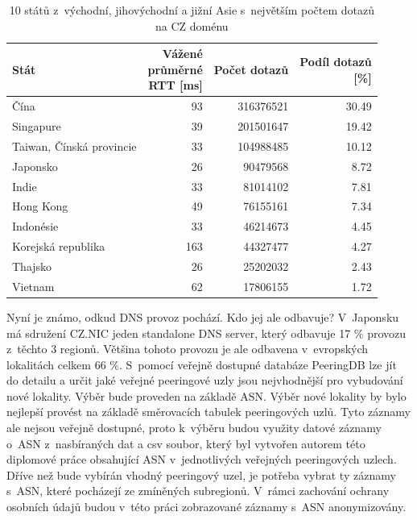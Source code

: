 \documentclass[thesis=M,czech]{src/FITthesis}[2019/12/23]
\begin{document}
\begin{table}
\centering
\begin{tabular}{lrrr}
\toprule
           Stát  &  \makecell{Vážené\\průměrné\\RTT [ms]} &  Počet dotazů &  \makecell{Podíl dotazů\\\ [\%]} \\
\midrule
                    Čína &  93 & 316376521 & 30.49 \\
               Singapure &  39 & 201501647 & 19.42 \\
Taiwan, Čínská provincie &  33 & 104988485 & 10.12 \\
                Japonsko &  26 &  90479568 &  8.72 \\
                   Indie &  33 &  81014102 &  7.81 \\
               Hong Kong &  49 &  76155161 &  7.34 \\
               Indonésie &  33 &  46214673 &  4.45 \\
      Korejská republika & 163 &  44327477 &  4.27 \\
                 Thajsko &  26 &  25202032 &  2.43 \\
                 Vietnam &  62 &  17806155 &  1.72 \\

\bottomrule
\end{tabular}
 	\caption[]{10 států z~východní, jihovýchodní a jižní Asie s~největším počtem dotazů na CZ doménu} 
 	\label{tab:anycast_asia_states}
\end{table}
 
Nyní je známo, odkud DNS provoz pochází. Kdo jej ale odbavuje? V~Japonsku má sdružení CZ.NIC jeden standalone DNS server, který odbavuje 17 \% provozu z~těchto 3 regionů. Většina tohoto provozu je ale odbavena v~evropských lokalitách celkem 66 \%. S~pomocí veřejně dostupné databáze PeeringDB lze jít do detailu a určit jaké veřejné peeringové uzly jsou nejvhodnější pro vybudování nové lokality. Výběr bude proveden na základě ASN. Výběr nové lokality by bylo nejlepší provést na  základě směrovacích tabulek peeringových uzlů. Tyto záznamy ale nejsou veřejně dostupné, proto k~výběru budou využity datové záznamy o~ASN z~nasbíraných dat a csv soubor, který byl vytvořen autorem této diplomové práce obsahující ASN v~jednotlivých veřejných peeringových uzlech. Dříve než bude vybírán vhodný peeringový uzel, je potřeba vybrat ty záznamy s~ASN, které pocházejí ze zmíněných subregionů. V~rámci zachování ochrany osobních údajů budou v~této práci zobrazované záznamy s~ASN anonymizovány. 
\end{document}

